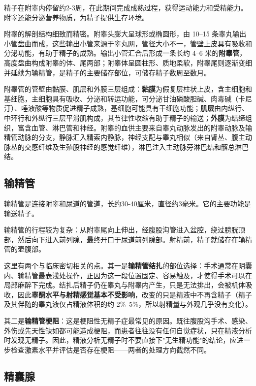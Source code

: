 \documentclass[12pt,a4paper,twoside]{ctexbook}
\begin{document}
精子在附睾内停留约2-3周，在此期间完成成熟过程，获得运动能力和受精能力。附睾还能分泌营养物质，为精子提供生存环境。

附睾的解剖结构细致而精密。附睾头膨大呈球形或椭圆形，由 10--15 条睾丸输出小管盘曲而成，这些输出小管来源于睾丸网，管径大小不一，管壁上皮具有吸收和分泌功能，有助于精子的成熟。输出小管汇合后形成一条长约 4--6 米的\textbf{附睾管}，高度盘曲构成附睾的体、尾两部；附睾体呈圆柱形、质地柔软，附睾尾则逐渐变细并延续为输精管，是精子的主要储存部位，可储存精子数周至数月。

附睾管的管壁由黏膜、肌层和外膜三层组成：\textbf{黏膜}为假复层柱状上皮，含主细胞和基细胞，主细胞具有吸收、分泌和转运功能，可分泌甘油磷酸胆碱、肉毒碱（卡尼汀）、唾液酸等物质促进精子成熟，基细胞可能具有干细胞功能；\textbf{肌层}由内纵行、中环行和外纵行三层平滑肌构成，其节律性收缩有助于精子的输送；\textbf{外膜}为结缔组织，富含血管、淋巴管和神经。附睾的血供主要来自睾丸动脉发出的附睾动脉及输精管动脉的分支，静脉汇入精索内静脉，神经支配与睾丸相似（来自肾丛、腹主动脉丛的交感纤维及生殖股神经的感觉纤维），淋巴注入主动脉旁淋巴结和髂总淋巴结。

\subsection{输精管}

输精管是连接附睾和尿道的管道，长约30-40厘米，直径约3毫米。它的主要功能是输送精子。

输精管的行程较为复杂：从附睾尾向上伸出，经腹股沟管进入盆腔，绕过膀胱顶部，然后向下进入前列腺，最终开口于尿道前列腺部。射精前，精子就储存在输精管的壶腹部。


这里有两个与临床密切相关的点。其一是\textbf{输精管结扎}的部位选择：手术通常在阴囊内、输精管最表浅处操作，正因为这一段位置固定、容易触及，才使得手术可以在局部麻醉下完成。结扎后精子仍在睾丸与附睾内产生，只是无法排出，会被机体吸收，因此\textbf{睾酮水平与射精感觉基本不受影响}，改变的只是精液中不再含精子（精子及其伴随的睾丸液仅占精液体积的约 2\%--5\%，所以射精量与外观几乎没有变化）。

其二是\textbf{输精管梗阻}：这是梗阻性无精子症最常见的原因。既往腹股沟手术、感染、外伤或先天性缺如都可能造成梗阻，而患者往往没有任何自觉症状，只在精液分析时发现无精子。因此，精液分析无精子时不要直接下"无生精功能"的结论，应进一步检查激素水平并评估是否存在梗阻——两者的处理方向截然不同。

\subsection{精囊腺}
\end{document}
